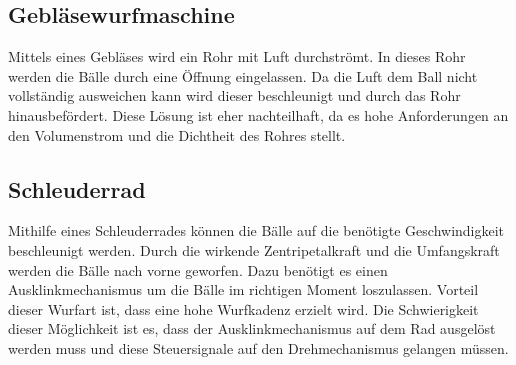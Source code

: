\subsection{Gebläsewurfmaschine}
Mittels eines Gebläses wird ein Rohr mit Luft durchströmt. In dieses Rohr werden die Bälle durch eine Öffnung eingelassen. Da die Luft dem Ball nicht vollständig ausweichen kann wird dieser beschleunigt und durch das Rohr hinausbefördert. Diese Lösung ist eher nachteilhaft, da es hohe Anforderungen an den Volumenstrom und die Dichtheit des Rohres stellt.

\subsection{Schleuderrad}
Mithilfe eines Schleuderrades können die Bälle auf die benötigte Geschwindigkeit beschleunigt werden. Durch die wirkende Zentripetalkraft und die Umfangskraft werden die Bälle nach vorne geworfen. Dazu benötigt es einen Ausklinkmechanismus um die Bälle im richtigen Moment loszulassen. Vorteil dieser Wurfart ist, dass eine hohe Wurfkadenz erzielt wird. Die Schwierigkeit dieser Möglichkeit ist es, dass der Ausklinkmechanismus auf dem Rad ausgelöst werden muss und diese Steuersignale auf den Drehmechanismus gelangen müssen.
